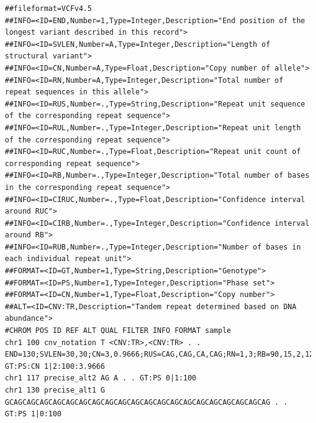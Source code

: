 \documentclass[8pt]{article}
\begin{document}
\pagebreak
\footnotesize
\begin{landscape}
\begin{verbatim}
##fileformat=VCFv4.5
##INFO=<ID=END,Number=1,Type=Integer,Description="End position of the longest variant described in this record">
##INFO=<ID=SVLEN,Number=A,Type=Integer,Description="Length of structural variant">
##INFO=<ID=CN,Number=A,Type=Float,Description="Copy number of allele">
##INFO=<ID=RN,Number=A,Type=Integer,Description="Total number of repeat sequences in this allele">
##INFO=<ID=RUS,Number=.,Type=String,Description="Repeat unit sequence of the corresponding repeat sequence">
##INFO=<ID=RUL,Number=.,Type=Integer,Description="Repeat unit length of the corresponding repeat sequence">
##INFO=<ID=RUC,Number=.,Type=Float,Description="Repeat unit count of corresponding repeat sequence">
##INFO=<ID=RB,Number=.,Type=Integer,Description="Total number of bases in the corresponding repeat sequence">
##INFO=<ID=CIRUC,Number=.,Type=Float,Description="Confidence interval around RUC">
##INFO=<ID=CIRB,Number=.,Type=Integer,Description="Confidence interval around RB">
##INFO=<ID=RUB,Number=.,Type=Integer,Description="Number of bases in each individual repeat unit">
##FORMAT=<ID=GT,Number=1,Type=String,Description="Genotype">
##FORMAT=<ID=PS,Number=1,Type=Integer,Description="Phase set">
##FORMAT=<ID=CN,Number=1,Type=Float,Description="Copy number">
##ALT=<ID=CNV:TR,Description="Tandem repeat determined based on DNA abundance">
#CHROM POS ID REF ALT QUAL FILTER INFO FORMAT sample
chr1 100 cnv_notation T <CNV:TR>,<CNV:TR> . . END=130;SVLEN=30,30;CN=3,0.9666;RUS=CAG,CAG,CA,CAG;RN=1,3;RB=90,15,2,12  GT:PS:CN 1|2:100:3.9666
chr1 117 precise_alt2 AG A . . GT:PS 0|1:100
chr1 130 precise_alt1 G GCAGCAGCAGCAGCAGCAGCAGCAGCAGCAGCAGCAGCAGCAGCAGCAGCAGCAGCAGCAG . . GT:PS 1|0:100
\end{verbatim}
\end{landscape}
\pagebreak
\normalsize
\end{document}
